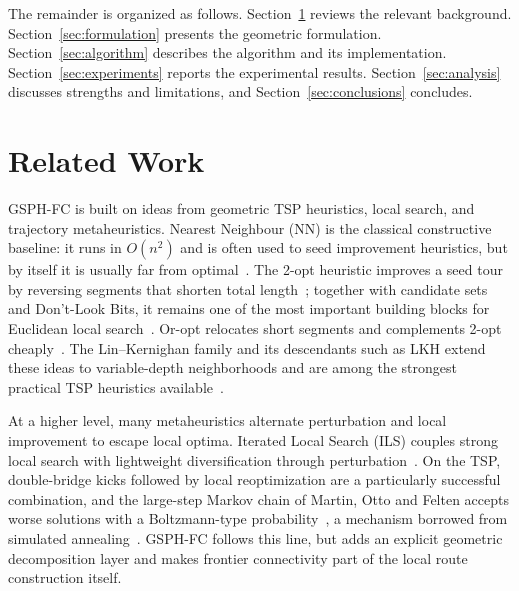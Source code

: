 \documentclass[runningheads]{llncs}
\begin{document}
The remainder is organized as follows. Section~\ref{sec:related}
reviews the relevant background. Section~\ref{sec:formulation}
presents the geometric formulation. Section~\ref{sec:algorithm}
describes the algorithm and its implementation.
Section~\ref{sec:experiments} reports the experimental results.
Section~\ref{sec:analysis} discusses strengths and limitations, and
Section~\ref{sec:conclusions} concludes.

\section{Related Work}
\label{sec:related}

GSPH-FC is built on ideas from geometric TSP heuristics, local search,
and trajectory metaheuristics. Nearest Neighbour (NN) is the classical
constructive baseline: it runs in $O(n^2)$ and is often used to seed
improvement heuristics, but by itself it is usually far from
optimal~\cite{kizilatecs2013nearest}. The 2-opt heuristic improves a
seed tour by reversing segments that shorten total
length~\cite{croes1958method}; together with candidate sets and
Don't-Look Bits, it remains one of the most important building blocks
for Euclidean local search~\cite{johnson1997tsp,bentley1992fast}. Or-opt
relocates short segments and complements 2-opt
cheaply~\cite{or1976traveling}. The Lin--Kernighan family and its
descendants such as LKH extend these ideas to variable-depth
neighborhoods and are among the strongest practical TSP heuristics
available~\cite{lin1973effective,helsgaun2000effective,helsgaun2017extension}.

At a higher level, many metaheuristics alternate perturbation and local
improvement to escape local optima. Iterated Local Search (ILS) couples
strong local search with lightweight diversification through
perturbation~\cite{lourencco2003ils}. On the TSP, double-bridge kicks
followed by local reoptimization are a particularly successful
combination, and the large-step Markov chain of Martin, Otto and
Felten accepts worse solutions with a Boltzmann-type
probability~\cite{martin1991large}, a mechanism borrowed from simulated
annealing~\cite{kirkpatrick1983optimization}. GSPH-FC follows this line,
but adds an explicit geometric decomposition layer and makes frontier
connectivity part of the local route construction itself.
\end{document}

